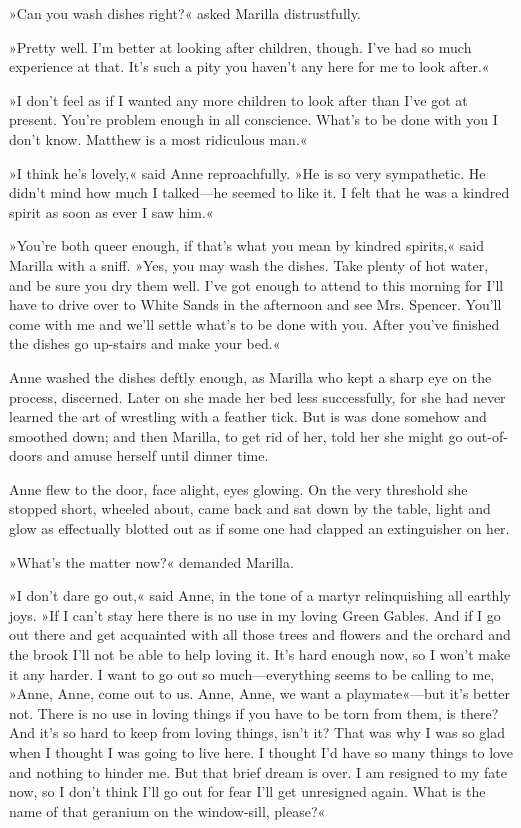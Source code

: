 »Can you wash dishes right?« asked Marilla distrustfully.

»Pretty well. I’m better at looking after children, though. I’ve had so much experience at that. It’s such a pity you haven’t any here for me to look after.«

»I don’t feel as if I wanted any more children to look after than I’ve got at present. You’re problem enough in all conscience. What’s to be done with you I don’t know. Matthew is a most ridiculous man.«

»I think he’s lovely,« said Anne reproachfully. »He is so very sympathetic. He didn’t mind how much I talked—he seemed to like it. I felt that he was a kindred spirit as soon as ever I saw him.«

»You’re both queer enough, if that’s what you mean by kindred spirits,« said Marilla with a sniff. »Yes, you may wash the dishes. Take plenty of hot water, and be sure you dry them well. I’ve got enough to attend to this morning for I’ll have to drive over to White Sands in the afternoon and see Mrs. Spencer. You’ll come with me and we’ll settle what’s to be done with you. After you’ve finished the dishes go up-stairs and make your bed.«

Anne washed the dishes deftly enough, as Marilla who kept a sharp eye on the process, discerned. Later on she made her bed less successfully, for she had never learned the art of wrestling with a feather tick. But is was done somehow and smoothed down; and then Marilla, to get rid of her, told her she might go out-of-doors and amuse herself until dinner time.

Anne flew to the door, face alight, eyes glowing. On the very threshold she stopped short, wheeled about, came back and sat down by the table, light and glow as effectually blotted out as if some one had clapped an extinguisher on her.

»What’s the matter now?« demanded Marilla.

»I don’t dare go out,« said Anne, in the tone of a martyr relinquishing all earthly joys. »If I can’t stay here there is no use in my loving Green Gables. And if I go out there and get acquainted with all those trees and flowers and the orchard and the brook I’ll not be able to help loving it. It’s hard enough now, so I won’t make it any harder. I want to go out so much—everything seems to be calling to me, »Anne, Anne, come out to us. Anne, Anne, we want a playmate«—but it’s better not. There is no use in loving things if you have to be torn from them, is there? And it’s so hard to keep from loving things, isn’t it? That was why I was so glad when I thought I was going to live here. I thought I’d have so many things to love and nothing to hinder me. But that brief dream is over. I am resigned to my fate now, so I don’t think I’ll go out for fear I’ll get unresigned again. What is the name of that geranium on the window-sill, please?«

